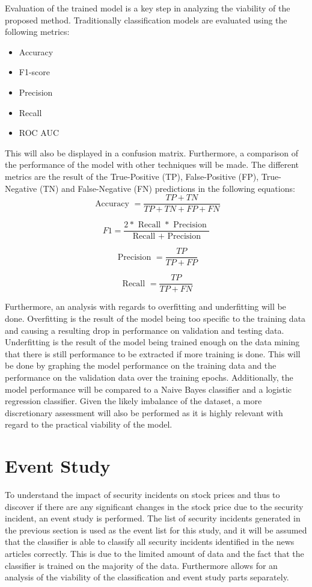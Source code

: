 Evaluation of the trained model is a key step in analyzing the viability of the proposed method. Traditionally classification models are evaluated using the following metrics:

\begin{itemize}
  \item Accuracy
  \item F1-score
  \item Precision
  \item Recall
  \item ROC AUC
\end{itemize}


This will also be displayed in a confusion matrix. Furthermore, a comparison of the performance of the model with other techniques will be made. The different metrics are the result of the True-Positive (TP), False-Positive (FP), True-Negative (TN) and False-Negative (FN) predictions in the following equations:
$$
\text { Accuracy }=\frac{T P+T N}{T P+T N+F P+F N}
$$

$$
F 1=\frac{2 * \text { Recall } * \text { Precision }}{\text { Recall }+\text { Precision }}
$$

$$
\text { Precision }=\frac{T P}{T P+F P}
$$

$$
\text { Recall }=\frac{T P}{T P+F N}
$$

Furthermore, an analysis with regards to overfitting and underfitting will be done. Overfitting is the result of the model being too specific to the training data and causing a resulting drop in performance on validation and testing data. Underfitting is the result of the model being trained enough on the data mining that there is still performance to be extracted if more training is done. This will be done by graphing the model performance on the training data and the performance on the validation data over the training epochs. Additionally, the model performance will be compared to a Naive Bayes classifier and a logistic regression classifier. Given the likely imbalance of the dataset, a more discretionary assessment will also be performed as it is highly relevant with regard to the practical viability of the model.

\section{Event Study}
To understand the impact of security incidents on stock prices and thus to discover if there are any significant changes in the stock price due to the security incident, an event study is performed. The list of security incidents generated in the previous section is used as the event list for this study, and it will be assumed that the classifier is able to classify all security incidents identified in the news articles correctly. This is due to the limited amount of data and the fact that the classifier is trained on the majority of the data. Furthermore allows for an analysis of the viability of the classification and event study parts separately.


